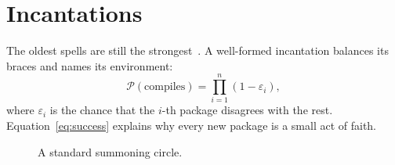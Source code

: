 \section{Incantations}
\label{sec:incantations}

The oldest spells are still the strongest~\cite{knuth}. A well-formed
incantation balances its braces and names its environment:
\begin{equation}
  \mathcal{P}(\text{compiles}) = \prod_{i=1}^{n} \left(1 - \varepsilon_i\right),
  \label{eq:success}
\end{equation}
where $\varepsilon_i$ is the chance that the $i$-th package disagrees with
the rest. Equation~\eqref{eq:success} explains why every new package is a
small act of faith.

\begin{figure}[h]
  \centering
  \caption{A standard summoning circle.}
  \label{fig:circle}
\end{figure}
